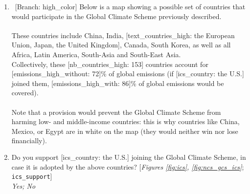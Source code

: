 \begin{enumerate}[resume]
\item ~[Branch: high\_color]  \label{q:gcs_high_color} Below is a map showing a possible set of countries that would participate in the Global Climate Scheme previously described.\\
~\\
These countries include China, India, [text\_countries\_high: the European Union, Japan, the United Kingdom], Canada, South Korea, as well as all Africa, Latin America, South-Asia and South-East Asia. \\
Collectively, these [nb\_countries\_high: 153] countries account for [emissions\_high\_without: 72]\% of global emissions (if [ics\_country: the U.S.] joined them, [emissions\_high\_with: 86]\% of global emissions would be covered).\\\\Note that a provision would prevent the Global Climate Scheme from harming low- and middle-income countries: this is why countries like China, Mexico, or Egypt are in white on the map (they would neither win nor lose financially).\\


\item  \label{q:ics_support} Do you support [ics\_country: the U.S.] joining the Global Climate Scheme, in case it is adopted by the above countries? [\textit{Figures \ref{fig:ics}, \ref{fig:ncs_gcs_ics}}; 
\verb|ics_support|]
  \\ \textit{Yes; No}

\end{enumerate} 

